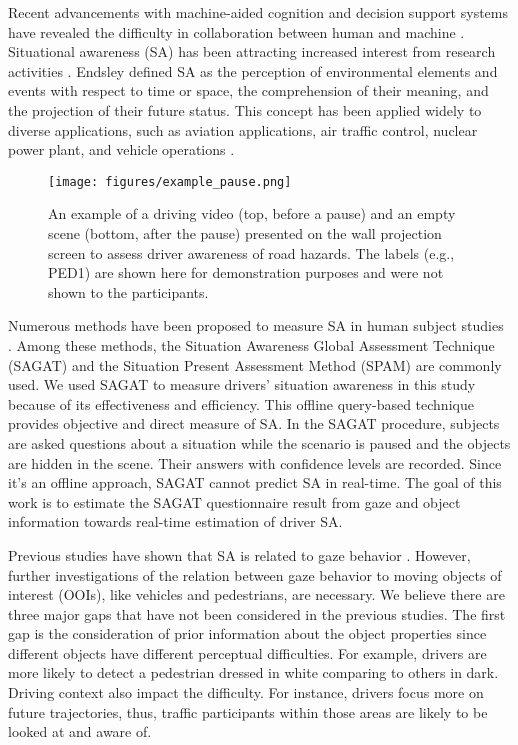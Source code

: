 \documentclass[letterpaper, 10 pt, conference]{ieeeconf}  %
\begin{document}
Recent advancements with machine-aided cognition and decision support systems have revealed the difficulty in collaboration between human and machine \cite{hancock2013human}. Situational awareness (SA) has been attracting increased interest from research activities \cite{endsley2016designing}. Endsley \cite{endsley1995toward} defined SA as the perception of environmental elements and events with respect to time or space, the comprehension of their meaning, and the projection of their future status. This concept has been applied widely to diverse applications, such as aviation applications, air traffic control, nuclear power plant, and vehicle operations \cite{moore2010development, nguyen2019review, gugerty2011situation}.

\begin{figure*}[!t]
    \centering
    \texttt{[image: figures/example\_pause.png]}
    \caption{An example of a driving video (top, before a pause) and an empty scene (bottom, after the pause) presented on the wall projection screen to assess driver awareness of road hazards. The labels (e.g., PED1) are shown here for demonstration purposes and were not shown to the participants.}
    \label{fig:example_pause}
    \vspace{-3mm}
\end{figure*}

Numerous methods have been proposed to measure SA in human subject studies \cite{gugerty2011situation, kaber2012effects, hofbauer2020measuring}. Among these methods, the Situation Awareness Global Assessment Technique (SAGAT) \cite{endsley1988situation, endsley1995measurement, endsley2000direct} and the Situation Present Assessment Method (SPAM) \cite{durso1998situation} are commonly used. We used SAGAT to measure drivers' situation awareness in this study because of its effectiveness and efficiency. This offline query-based technique provides objective and direct measure of SA. In the SAGAT procedure, subjects are asked questions about a situation while the scenario is paused and the objects are hidden in the scene. Their answers with confidence levels are recorded. Since it's an offline approach, SAGAT cannot predict SA in real-time. The goal of this work is to estimate the SAGAT questionnaire result from gaze and object information towards real-time estimation of driver SA.

Previous studies have shown that SA is related to gaze behavior \cite{martin2018dynamics, kim2020toward}. However, further investigations of the relation between gaze behavior to moving objects of interest (OOIs), like vehicles and pedestrians, are necessary. We believe there are three major gaps that have not been considered in the previous studies. The first gap is the consideration of prior information about the object properties since different objects have different perceptual difficulties. For example, drivers are more likely to detect a pedestrian dressed in white comparing to others in dark. Driving context also impact the difficulty. For instance, drivers focus more on future trajectories, thus, traffic participants within those areas are likely to be looked at and aware of.
\end{document}

